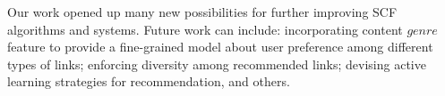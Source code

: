 Our work opened up many new possibilities for further improving 
SCF algorithms and systems. Future work can include:
incorporating content $\mathit{genre}$ feature 
to provide a fine-grained model about user preference among different types of links;
enforcing diversity among recommended links;
devising active learning strategies for recommendation, and others.

